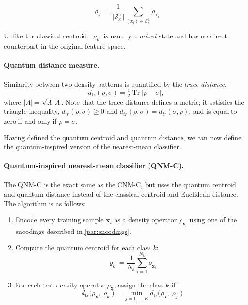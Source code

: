\documentclass[twocolumn]{article} %
\begin{document}
\begin{equation}
  \varrho_{k}= \frac{1}{\lvert\mathcal S_{k}^{\mathrm{tr}}\rvert}
               \sum_{(\mathbf x_i)\in\mathcal S_{k}^{\mathrm{tr}}}
               \rho_{\mathbf x_i}
  \label{eq:quantum-centroid}
\end{equation}


Unlike the classical centroid, \(\varrho_{k}\) is usually a
\emph{mixed} state and has no direct counterpart in the original
feature space.

\paragraph{Quantum distance measure.}
Similarity between two density patterns is quantified by the
\emph{trace distance},
\begin{equation}
  d_{\operatorname{tr}}(\rho,\sigma)=
  \tfrac12\operatorname{Tr}\!\bigl|\rho-\sigma\bigr|,
  \label{eq:trace-distance-def}
\end{equation}
where \(\lvert A\rvert=\sqrt{A^{\dagger}A}\). Note that the trace distance defines a metric; it satisfies the triangle inequality, $d_{tr}(\rho, \sigma) \geq 0$ and $d_{tr}(\rho, \sigma) = d_{tr}(\sigma, \rho)$, and is equal to zero if and only if $\rho = \sigma$.

\smallskip

Having defined the quantum centroid and quantum distance, we can now define the quantum-inspired version of the nearest-mean classifier.

\paragraph{Quantum-inspired nearest-mean classifier (QNM-C).}
The QNM-C is the exact same as the CNM-C, but uses the quantum centroid and quantum distance instead of the classical centroid and Euclidean distance. The algorithm is as follows:
\begin{enumerate}[leftmargin=*,label=(\alph*)]
    \item Encode every training sample \(\mathbf x_i\) as a density operator
      \(\rho_{\mathbf x_i}\) using one of the encodings described in \ref{par:encodings}.

    \item Compute the quantum centroid for each class \(k\):
        \begin{equation}
          \varrho_{k}= \frac{1}{N_k}\sum_{i=1}^{N_k}\rho_{\mathbf x_i}
          \label{eq:quantum-centroid-avg}
        \end{equation}

    \item For each test density operator \(\rho_{\mathbf x}\), assign the class $k$ if 
        \begin{equation}
          d_{\operatorname{tr}}\!\bigl(\rho_{\mathbf x},\varrho_{k}\bigr)
          = \min_{j=1,\dots,K}
            d_{\operatorname{tr}}\!\bigl(\rho_{\mathbf x},\varrho_{j}\bigr)
          \label{eq:qnm-decision-rule}
        \end{equation}

\end{enumerate}
\end{document}
